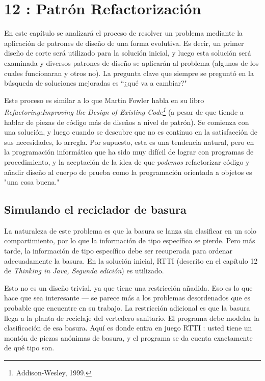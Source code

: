 \section*{12 : Patrón Refactorización}
\label{sec:pr}


En este capítulo se analizará el proceso de resolver un problema mediante la aplicación de patrones de diseño de una forma evolutiva. Es decir, un primer diseño de corte será utilizado para la solución inicial, y luego esta solución será examinada y diversos patrones de diseño se aplicarán al problema (algunos de los cuales funcionaran y otros no). La pregunta clave que siempre se preguntó en la búsqueda de soluciones mejoradas es “¿qué va a cambiar?"     \newline

Este proceso es similar a lo que Martin Fowler habla en su libro \textit{Refactoring:Improving the Design of Existing Code\footnote{Addison-Wesley, 1999.}} (a pesar de que tiende a hablar de piezas de código más de diseños a nivel de patrón). 
Se comienza con una solución, y luego cuando se descubre que no es continuo en la satisfacción de sus necesidades, lo arregla. Por supuesto, esta es una tendencia natural, pero en la programación informática que ha sido muy difícil de lograr con programas de procedimiento, y la aceptación de la idea de que \textit{podemos} refactorizar código y añadir diseño al cuerpo de prueba como la programación orientada a objetos es "una cosa buena." \newline



\subsection*{Simulando el reciclador de basura}
\label{subsec:serdb}

La naturaleza de este problema es que la basura se lanza sin clasificar en un solo compartimiento, por lo que la información de tipo específico se pierde. Pero más tarde, la información de tipo específico debe ser recuperada para ordenar adecuadamente la basura. En la solución inicial, RTTI (descrito en el capítulo 12 de \textit{Thinking in Java, Segunda edición}) es utilizado.    \newline

Esto no es un diseño trivial, ya que tiene una restricción añadida. Eso es lo que hace que sea interesante — se parece más a los problemas desordenados que es probable que encuentre en su trabajo. La restricción adicional es que la basura llega a la planta de reciclaje del vertedero sanitario. El programa debe modelar la clasificación de esa basura. Aquí es donde entra en juego RTTI : usted tiene un montón de piezas anónimas de basura, y el programa se da cuenta exactamente de qué tipo son.  \newline


